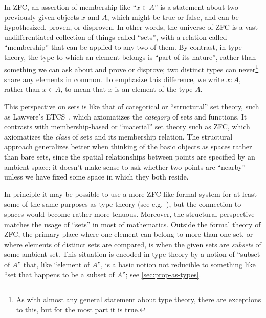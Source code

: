 \documentclass[10pt]{article}
\numberwithin{equation}{section}
\begin{document}

In ZFC, an assertion of membership like ``$x\in A$'' is a statement about two previously given objects $x$ and $A$, which might be true or false, and can be hypothesized, proven, or disproven.
In other words, the universe of ZFC is a vast undifferentiated collection of things called ``sets'', with a relation called ``membership'' that can be applied to any two of them.
By contrast, in type theory, the type to which an element belongs is ``part of its nature'', rather than something we can ask about and prove or disprove; two distinct types can never\footnote{As with almost any general statement about type theory, there are exceptions to this, but for the most part it is true.} share any elements in common.
To emphasize this difference, we write $x:A$, rather than $x\in A$, to mean that $x$ is an element of the type $A$.

This perspective on sets is like that of categorical or ``structural'' set theory, such as Lawvere's ETCS~\cite{lawvere:etcs-long,leinster:etcs}, which axiomatizes the \emph{category} of sets and functions.
It contrasts with membership-based or ``material'' set theory such as ZFC, which axiomatizes the \emph{class} of sets and its membership relation.
The structural approach generalizes better when thinking of the basic objects as spaces rather than bare sets, since the spatial relationships between points are specified by an ambient space: it doesn't make sense to ask whether two points are ``nearby'' unless we have fixed some space in which they both reside.

In principle it may be possible to use a more ZFC-like formal system for at least some of the same purposes as type theory (see e.g.~\cite{abss:long-version}), but the connection to spaces would become rather more tenuous.
Moreover, the structural perspective matches the usage of ``sets'' in most of mathematics.
Outside the formal theory of ZFC, the primary place where one element can belong to more than one set, or where elements of distinct sets are compared, is when the given sets are \emph{subsets} of some ambient set.
This situation is encoded in type theory by a notion of ``subset of $A$'' that, like ``element of $A$'', is a basic notion not reducible to something like ``set that happens to be a subset of $A$''; see \cref{sec:prop-as-types}.
\end{document}
